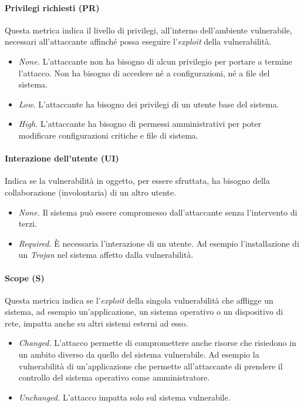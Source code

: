 \documentclass[target=bach,aauheader=]{thud}
\begin{document}
\paragraph{Privilegi richiesti (PR)} Questa metrica indica il livello di privilegi, all'interno dell'ambiente vulnerabile, necessari all'attaccante affinché possa eseguire l'\textit{exploit} della vulnerabilità.

    \begin{itemize}
        \item \textit{None.} L'attaccante non ha bisogno di alcun privilegio per portare a termine l'attacco. Non ha bisogno di accedere né a configurazioni, né a file del sistema.
        \item \textit{Low.} L'attaccante ha bisogno dei privilegi di un utente base del sistema.
        \item \textit{High.} L'attaccante ha bisogno di permessi amministrativi per poter modificare configurazioni critiche e file di sistema.
    \end{itemize}

\paragraph{Interazione dell'utente (UI)} Indica se la vulnerabilità in oggetto, per essere sfruttata, ha bisogno della collaborazione (involontaria) di un altro utente.

    \begin{itemize}
        \item \textit{None.} Il sistema può essere compromesso dall'attaccante senza l'intervento di terzi.
        \item \textit{Required.} È necessaria l'interazione di un utente. Ad esempio l'installazione di un \textit{Trojan} nel sistema affetto dalla vulnerabilità.
    \end{itemize}

\paragraph{Scope (S)} Questa metrica indica se l'\textit{exploit} della singola vulnerabilità che affligge un sistema, ad esempio un'applicazione, un sistema operativo o un dispositivo di rete, impatta anche su altri sistemi esterni ad esso.

    \begin{itemize}
        \item \textit{Changed.} L'attacco permette di compromettere anche risorse che risiedono in un ambito diverso da quello del sistema vulnerabile. Ad esempio la vulnerabilità di un'applicazione che permette all'attaccante di prendere il controllo del sistema operativo come amministratore.
        \item \textit{Unchanged.} L'attacco impatta solo sul sistema vulnerabile.
    \end{itemize}
\end{document}
